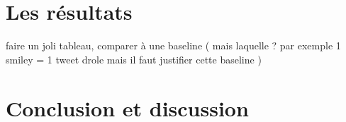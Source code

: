 \documentclass[10pt,a4paper,twoside]{article}
\begin{document}
\section{Les résultats}
faire un joli tableau, comparer à une baseline ( mais laquelle ? par exemple  1 smiley = 1 tweet drole mais il faut justifier cette baseline ) 

\section{Conclusion et discussion}

%
%
%
%
%
%
%
\end{document}

